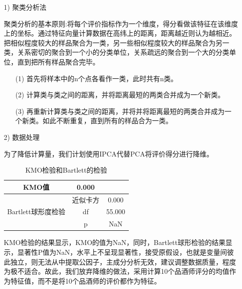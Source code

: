 \documentclass[UTF8]{ctexart}
\begin{document}
\begin{itemize}
	\item [1)]聚类分析法

	      聚类分析的基本原则:将每个评价指标作为一个维度，得分看做该特征在该维度上的坐标。通过特征向量计算数据在高纬上的距离，距离越近则认为越相近。把相似程度较大的样品聚合为一类，另一些相似程度较大的样品聚合为另一类，关系密切的聚合到一个小的分类单位，关系疏远的聚合到一个大的分类单位，直到把所有样品聚合完毕。
	      \begin{itemize}
		      \item [(1)]首先将样本中的n个点各看作一类，此时共有n类。
		      \item [(2)]计算类与类之间的距离，并将距离最短的两类合并成为一个新类。
		      \item [(3)]再重新计算类与类之间的距离，并将并将距离最短的两类合并成为一个新类。如此不断重复，直到所有的样品合为一类。
	      \end{itemize}
	\item [2)]数据处理

	      为了降低计算量，我们计划使用IPCA\cite{jeong2009ipca}代替PCA\cite{daffertshofer2004pca}将评价得分进行降维。

	      \begin{table}[h!]
		      \begin{center}
			      \caption{KMO检验和Bartlett的检验}
			      \begin{tabular}{c c c}
				      \hline
				      KMO值                                                    & 0.000             \\
				      \hline
				      \multicolumn{1}{c|}{\multirow{3}{*}{Bartlett球形度检验}} & 近似卡方 & 0.000  \\
				      \multicolumn{1}{c|}{}                                    & df       & 55.000 \\
				      \multicolumn{1}{c|}{}                                    & p        & NaN    \\
				      \hline
			      \end{tabular}
		      \end{center}
	      \end{table}
	      KMO检验\cite{dziuban1974correlation}的结果显示，KMO的值为NaN，同时，Bartlett球形检验的结果显示，显著性P值为NaN，水平上不呈现显著性，接受原假设，也就是变量间彼此独立，则无法从中提取公因子，主成分分析无效，建议调整数据质量，程度为极不适合。故此，我们放弃降维的做法，采用计算10个品酒师评分的均值作为特征值，而不是将10个品酒师的评价都作为特征。


\end{itemize}
\end{document}
